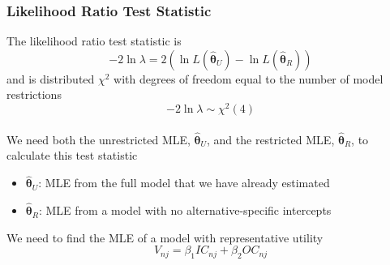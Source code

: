 \documentclass{beamer}\usepackage[]{graphicx}\usepackage[]{color}
\begin{document}
\begin{frame}\frametitle{Likelihood Ratio Test Statistic}
    The likelihood ratio test statistic is
    $$-2 \ln \lambda = 2 \left( \ln L(\widehat{\bm{\theta}}_U) - \ln L(\widehat{\bm{\theta}}_R) \right)$$
    and is distributed $\chi^2$ with degrees of freedom equal to the number of model restrictions
    $$-2 \ln \lambda \sim \chi^2(4)$$ \\
    \vspace{2ex}
    We need both the unrestricted MLE, $\widehat{\bm{\theta}}_U$, and the restricted MLE, $\widehat{\bm{\theta}}_R$, to calculate this test statistic
    \begin{itemize}
    	\item $\widehat{\bm{\theta}}_U$: MLE from the full model that we have already estimated
    	\item $\widehat{\bm{\theta}}_R$: MLE from a model with no alternative-specific intercepts
    \end{itemize}
    \vspace{2ex}
    We need to find the MLE of a model with representative utility
    $$V_{nj} = \beta_1 IC_{nj} + \beta_2 OC_{nj}$$
\end{frame}
\end{document}
